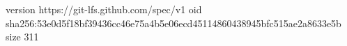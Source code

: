 version https://git-lfs.github.com/spec/v1
oid sha256:53e0d5f18bf39436cc46e75a4b5e06ecd45114860438945bfc515ae2a8633e5b
size 311
